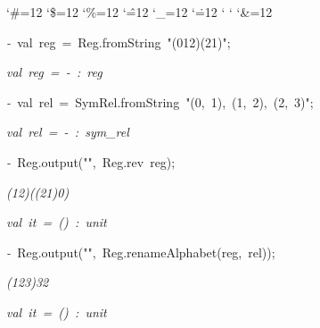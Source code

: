 \begin{list}{}
{\setlength{\leftmargin}{\leftmargini}
\setlength{\rightmargin}{0cm}
\setlength{\itemindent}{0cm}
\setlength{\listparindent}{0cm}
\setlength{\itemsep}{0cm}
\setlength{\parsep}{0cm}
\setlength{\labelsep}{0cm}
\setlength{\labelwidth}{0cm}
\catcode`\#=12
\catcode`\$=12
\catcode`\%=12
\catcode`\^=12
\catcode`\_=12
\catcode`\.=12
\catcode`
\catcode`
\catcode`\&=12
\ttfamily}
\small
\item[]\textsl{-\ }val\ reg\ =\ Reg.fromString\ "(012)(21)";
\item[]\textsl{val\ reg\ =\ -\ :\ reg}
\item[]\textsl{-\ }val\ rel\ =\ SymRel.fromString\ "(0,\ 1),\ (1,\ 2),\ (2,\ 3)";
\item[]\textsl{val\ rel\ =\ -\ :\ sym_rel}
\item[]\textsl{-\ }Reg.output("",\ Reg.rev\ reg);
\item[]\textsl{(12)((21)0)}
\item[]\textsl{val\ it\ =\ ()\ :\ unit}
\item[]\textsl{-\ }Reg.output("",\ Reg.renameAlphabet(reg,\ rel));
\item[]\textsl{(123)32}
\item[]\textsl{val\ it\ =\ ()\ :\ unit}
\end{list}
